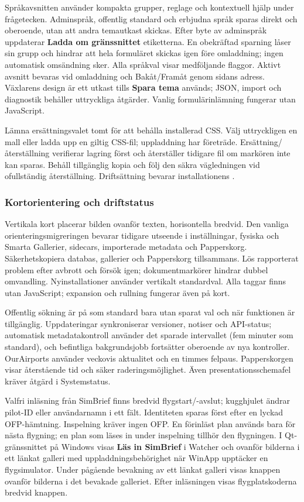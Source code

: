 \documentclass[11pt,a4paper]{article}
\newcommand{\filepath}[1]{\path{#1}}
\newcommand{\ui}[1]{\textbf{#1}}
\begin{document}
Språkavsnitten använder kompakta grupper, reglage och kontextuell hjälp under
frågetecken. Adminspråk, offentlig standard och erbjudna språk sparas direkt
och oberoende, utan att andra temautkast skickas. Efter byte av adminspråk
uppdaterar \ui{Ladda om gränssnittet} etiketterna. En obekräftad sparning låser
sin grupp och hindrar att hela formuläret skickas igen före omladdning;
ingen automatisk omsändning sker. Alla språkval visar medföljande flaggor.
Aktivt avsnitt bevaras vid omladdning och Bakåt/Framåt genom sidans adress.
Växlarens design är ett utkast tills \ui{Spara tema} används; JSON, import och
diagnostik behåller uttryckliga åtgärder. Vanlig formulärinlämning fungerar
utan JavaScript.

Lämna ersättningsvalet tomt för att behålla installerad CSS. Välj uttryckligen
en mall eller ladda upp en giltig CSS-fil; uppladdning har företräde.
Ersättning/återställning verifierar lagring först och återställer tidigare fil
om markören inte kan sparas. Behåll tillgänglig kopia och följ den säkra
vägledningen vid ofullständig återställning. Driftsättning bevarar
installationens \filepath{public/assets/custom.css}.

\subsubsection{Kortorientering och driftstatus}
Vertikala kort placerar bilden ovanför texten, horisontella bredvid. Den vanliga
orienteringsmigreringen bevarar tidigare utseende i inställningar, fysiska och
Smarta Gallerier, sidecars, importerade metadata och Papperskorg.
Säkerhetskopiera databas, gallerier och Papperskorg tillsammans. Lös rapporterat
problem efter avbrott och försök igen; dokumentmarkörer hindrar dubbel
omvandling. Nyinstallationer använder vertikalt standardval. Alla taggar finns
utan JavaScript; expansion och rullning fungerar även på kort.

Offentlig sökning är på som standard bara utan sparat val och när funktionen är
tillgänglig. Uppdateringar synkroniserar versioner, notiser och API-status;
automatisk metadatakontroll använder det sparade intervallet (fem minuter som
standard), och befintliga bakgrundsjobb fortsätter oberoende av nya kontroller.
OurAirports använder veckovis aktualitet och en timmes felpaus. Papperskorgen
visar återstående tid och säker raderingsmöjlighet. Även presentationsschemafel
kräver åtgärd i Systemstatus.

Valfri inläsning från SimBrief finns bredvid flygstart/-avslut; kugghjulet
ändrar pilot-ID eller användarnamn i ett fält. Identiteten sparas först efter
en lyckad OFP-hämtning. Inspelning kräver ingen OFP. En förinläst plan används
bara för nästa flygning; en plan som läses in under inspelning tillhör den
flygningen. I Qt-gränssnittet på Windows visas \ui{Läs in SimBrief}
i Watcher och ovanför bilderna i ett länkat galleri med uppladdningsbehörighet
när WinApp upptäcker en flygsimulator. Under pågående bevakning av ett länkat
galleri visas knappen ovanför bilderna i det bevakade galleriet. Efter
inläsningen visas flygplatskoderna bredvid knappen.
\end{document}
